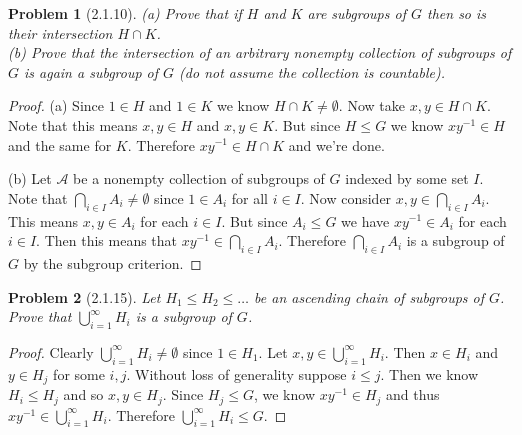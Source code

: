 \documentclass{article}
\newtheorem{problem}{Problem}
\begin{document}
\begin{problem}[2.1.10]
(a) Prove that if $H$ and $K$ are subgroups of $G$ then so is their intersection $H \cap K$.\\
(b) Prove that the intersection of an arbitrary nonempty collection of subgroups of $G$ is again a subgroup of $G$ (do not assume the collection is countable).
\end{problem}
\begin{proof}
(a) Since $1 \in H$ and $1 \in K$ we know $H \cap K \neq \emptyset$. Now take $x,y \in H \cap K$. Note that this means $x,y \in H$ and $x, y \in K$. But since $H \leq G$ we know $xy^{-1} \in H$ and the same for $K$. Therefore $xy^{-1} \in H \cap K$ and we're done.

(b) Let $\mathcal{A}$ be a nonempty collection of subgroups of $G$ indexed by some set $I$. Note that $\bigcap_{i \in I} A_i \neq \emptyset$ since $1 \in A_i$ for all $i \in I$. Now consider $x, y \in \bigcap_{i \in I} A_i$. This means $x,y \in A_i$ for each $i \in I$. But since $A_i \leq G$ we have $xy^{-1} \in A_i$ for each $i \in I$. Then this means that $xy^{-1} \in \bigcap_{i \in I} A_i$. Therefore $\bigcap_{i \in I} A_i$ is a subgroup of $G$ by the subgroup criterion.
\end{proof}

\begin{problem}[2.1.15]
\label{unionofsubgroups}
Let $H_1 \leq H_2 \leq \dots$ be an ascending chain of subgroups of $G$. Prove that $\bigcup_{i=1}^{\infty} H_i$ is a subgroup of $G$.
\end{problem}
\begin{proof}
Clearly $\bigcup_{i=1}^{\infty} H_i \neq \emptyset$ since $1 \in H_1$. Let $x,y \in \bigcup_{i=1}^{\infty} H_i$. Then $x \in H_i$ and $y \in H_j$ for some $i,j$. Without loss of generality suppose $i \leq j$. Then we know $H_i \leq H_j$ and so $x,y \in H_j$. Since $H_j \leq G$, we know $xy^{-1} \in H_j$ and thus $xy^{-1} \in \bigcup_{i=1}^{\infty} H_i$. Therefore $\bigcup_{i=1}^{\infty} H_i \leq G$.
\end{proof}
\end{document}
